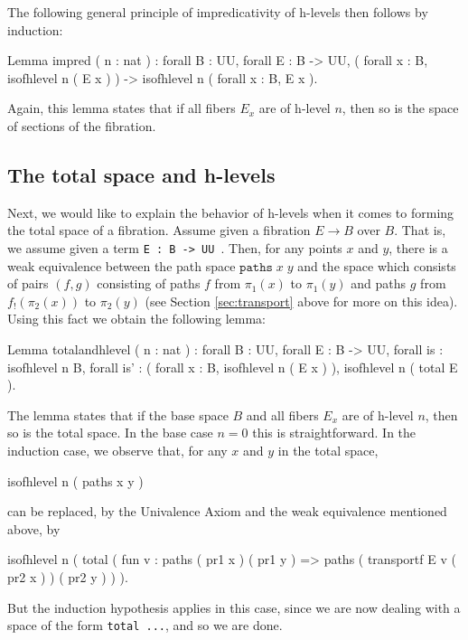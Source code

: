 The following general principle of impredicativity of h-levels then
follows by induction:
\begin{center}
  \begin{coqcode}
Lemma impred ( n : nat ) : forall B : UU, forall E : B -> UU, 
( forall x : B, isofhlevel n ( E x ) ) 
    -> isofhlevel n ( forall x : B, E x ).
  \end{coqcode}
\end{center}
Again, this lemma states that if all fibers $E_{x}$ are of h-level
$n$, then so is the space of sections of the fibration.

\subsection{The total space and h-levels}

Next, we would like to explain the behavior of h-levels when it comes
to forming the total space of a fibration.  Assume given a fibration
$E\to B$ over $B$.  That is, we assume given a term 
\verb|E : B -> UU |.  Then, for any points $x$ and $y$, there is
a weak equivalence between the path space $\texttt{paths}\;x\;y$ and
the space which consists of pairs $(f,g)$ consisting of paths $f$ from $\pi_{1}(x)$ to
$\pi_{1}(y)$ and paths $g$ from $f_{!}(\pi_{2}(x))$ to $\pi_{2}(y)$
(see Section \ref{sec:transport} above for more on this idea).  Using this fact we obtain the
following lemma:
\begin{center}
  \begin{coqcode}
Lemma totalandhlevel ( n : nat ) : forall B : UU, 
forall E : B -> UU, forall is : isofhlevel n B, 
forall is' : ( forall x : B, isofhlevel n ( E x ) ), 
isofhlevel n ( total E ).   
  \end{coqcode}
\end{center}
The lemma states that if the base space $B$ and all fibers $E_{x}$ are
of h-level $n$, then so is the total space.  In the base case $n=0$
this is straightforward.  In the induction case, we observe that, for
any $x$ and $y$ in the total space,
\begin{center}
  \begin{coqcode}
isofhlevel n ( paths x y )
  \end{coqcode}
\end{center}
can be replaced, by the Univalence Axiom and the weak equivalence
mentioned above, by 
\begin{center}
  \begin{coqcode}
isofhlevel n ( 
total ( fun v : paths ( pr1 x ) ( pr1 y ) => 
paths ( transportf E v ( pr2 x ) ) ( pr2 y ) ) ).
  \end{coqcode}
\end{center}
But the induction hypothesis applies in this case, since we are now
dealing with a space of the form \verb|total ...|, and so we are done.

